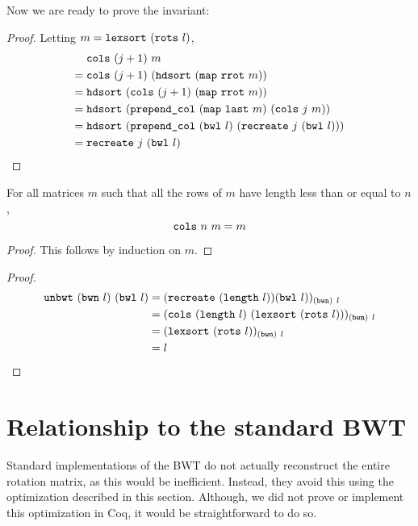 \documentclass[sigplan,10pt,anonymous,review]{thesis}
\begin{document}
Now we are ready to prove the invariant:
\recreatecorrectinv
\begin{proof}
  Letting $m = \texttt{\textup{lexsort}}~(\texttt{\textup{rots}}~l)$,
  \begin{align*}
    &\texttt{\textup{cols}}~(j+1)~m \\
    ={}& \texttt{\textup{cols}}~(j+1)~(\texttt{\textup{hdsort}}~(\texttt{\textup{map}}~\texttt{\textup{rrot}}~m)) \\
    ={}&
    \texttt{\textup{hdsort}}~(\texttt{\textup{cols}}~(j+1)~(\texttt{\textup{map}}~\texttt{\textup{rrot}}~m)) \\
    ={}&
    \texttt{\textup{hdsort}}~(\texttt{\textup{prepend\_col}}~(\texttt{\textup{map}}~\texttt{\textup{last}}~m)~(\texttt{\textup{cols}}~j~m)) \\
    ={}&
    \texttt{\textup{hdsort}}~(\texttt{\textup{prepend\_col}}~(\texttt{\textup{bwl}}~l)~(\texttt{\textup{recreate}}~j~(\texttt{\textup{bwl}}~l))) \\
    ={}& \texttt{\textup{recreate}}~j~(\texttt{\textup{bwl}}~l) \qedhere
  \end{align*}
\end{proof}

\begin{theorem}[cols\_id]
  For all matrices $m$ such that all the rows of $m$ have length less
  than or equal to $n$,
  \begin{equation*}
    \texttt{\textup{cols}}~n~m = m
  \end{equation*}
\end{theorem}
\begin{proof}
  This follows by induction on $m$.
\end{proof}

\unbwtcorrect
\begin{proof}
\begin{align*}
     \texttt{\textup{unbwt}}~(\texttt{\textup{bwn}}~l)~(\texttt{\textup{bwl}}~l)
  &= (\texttt{\textup{recreate}}~(\texttt{\textup{length}}~l))(\texttt{\textup{bwl}}~l))_{(\texttt{\textup{bwn}})~l}\\
  &= (\texttt{\textup{cols}}~(\texttt{\textup{length}}~l)~(\texttt{\textup{lexsort}}~(\texttt{\textup{rots}}~l)))_{(\texttt{\textup{bwn}})~l} \\
  &= (\texttt{\textup{lexsort}}~(\texttt{\textup{rots}}~l))_{(\texttt{\textup{bwn}})~l} \\
  &= l \qedhere
\end{align*}
\end{proof}

\section{Relationship to the standard BWT}
\label{sec:opt}

Standard implementations of the BWT do not actually reconstruct the
entire rotation matrix, as this would be inefficient. Instead, they
avoid this using the optimization described in this section. Although,
we did not prove or implement this optimization in Coq, it would be
straightforward to do so.
\end{document}
